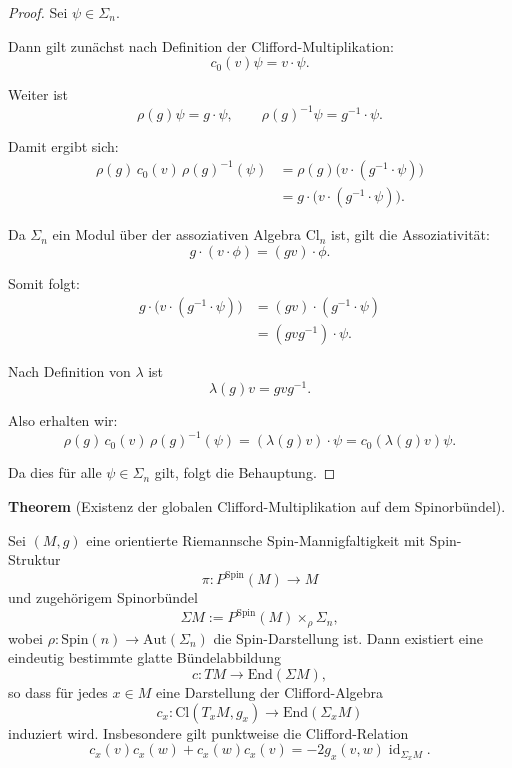 \documentclass[10pt, letterpaper]{article}
\newcommand{\id}{\operatorname{id}}
\newcommand{\Aut}{\mathrm{Aut}}
\newcommand{\End}{\mathrm{End}}
\newcommand{\Cl}{\mathrm{Cl}}
\newcommand{\Spin}{\mathrm{Spin}}
\newcommand{\CustomHeading}[3]{%
  \par\medskip\noindent%
  \textbf{#1 #2} \textnormal{(#3)}.\enskip%
}
\newenvironment{THEO}[2]{\CustomHeading{Theorem}{#1}{#2}}{}
\begin{document}
\begin{proof}
Sei $\psi\in \Sigma_n$.

Dann gilt zunächst nach Definition der Clifford-Multiplikation:
\[
c_0(v)\psi = v\cdot \psi.
\]

Weiter ist
\[
\rho(g)\psi = g\cdot \psi,
\qquad
\rho(g)^{-1}\psi = g^{-1}\cdot \psi.
\]

Damit ergibt sich:
\[
\begin{aligned}
\rho(g)\,c_0(v)\,\rho(g)^{-1}(\psi)
&=
\rho(g)\bigl(v\cdot (g^{-1}\cdot \psi)\bigr) \\
&=
g\cdot \bigl(v\cdot (g^{-1}\cdot \psi)\bigr).
\end{aligned}
\]

Da $\Sigma_n$ ein Modul über der assoziativen Algebra $\Cl_n$ ist,
gilt die Assoziativität:
\[
g\cdot (v\cdot \phi) = (g v)\cdot \phi.
\]

Somit folgt:
\[
\begin{aligned}
g\cdot \bigl(v\cdot (g^{-1}\cdot \psi)\bigr)
&=
(g v)\cdot (g^{-1}\cdot \psi) \\
&=
(g v g^{-1})\cdot \psi.
\end{aligned}
\]

Nach Definition von $\lambda$ ist
\[
\lambda(g)v = g v g^{-1}.
\]

Also erhalten wir:
\[
\rho(g)\,c_0(v)\,\rho(g)^{-1}(\psi)
=
(\lambda(g)v)\cdot \psi
=
c_0(\lambda(g)v)\psi.
\]

Da dies für alle $\psi\in \Sigma_n$ gilt, folgt die Behauptung.
\end{proof}

\pagebreak
\begin{THEO}{}{Existenz der globalen Clifford-Multiplikation auf dem Spinorbündel}
Sei $(M,g)$ eine orientierte Riemannsche Spin-Mannigfaltigkeit mit Spin-Struktur
\[
\pi: P^{\Spin}(M) \longrightarrow M
\]
und zugehörigem Spinorbündel
\[
\Sigma M := P^{\Spin}(M)\times_{\rho} \Sigma_n,
\]
wobei $\rho:\Spin(n)\to \Aut(\Sigma_n)$ die Spin-Darstellung ist.
Dann existiert eine eindeutig bestimmte glatte Bündelabbildung
\[
c: TM \longrightarrow \End(\Sigma M),
\]
so dass für jedes $x\in M$ eine Darstellung der Clifford-Algebra
\[
c_x: \Cl(T_xM,g_x)\longrightarrow \End(\Sigma_x M)
\]
induziert wird. Insbesondere gilt punktweise die Clifford-Relation
\[
c_x(v)c_x(w)+c_x(w)c_x(v) = -2g_x(v,w)\id_{\Sigma_x M}.
\]
\end{THEO}
\end{document}
